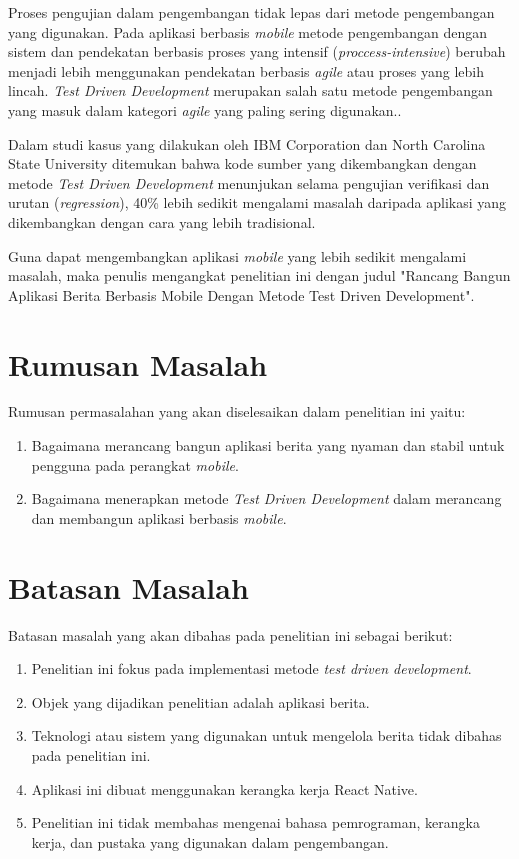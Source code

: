 \begin{spacing}{2}
Proses pengujian dalam pengembangan tidak lepas dari metode pengembangan yang digunakan. Pada aplikasi berbasis \emph{mobile} metode pengembangan dengan sistem dan pendekatan berbasis proses yang intensif (\emph{proccess-intensive}) berubah menjadi lebih menggunakan pendekatan berbasis \emph{agile} atau proses yang lebih lincah. \emph{Test Driven Development} merupakan salah satu metode pengembangan yang masuk dalam kategori \emph{agile} yang paling sering digunakan.\cite{wasserman2010}.

Dalam studi kasus yang dilakukan oleh IBM Corporation dan North Carolina State University ditemukan bahwa kode sumber yang dikembangkan dengan metode \emph{Test Driven Development} menunjukan selama pengujian verifikasi dan urutan (\emph{regression}), 40\% lebih sedikit mengalami masalah daripada aplikasi yang dikembangkan dengan cara yang lebih tradisional.\cite{laurie2003}

Guna dapat mengembangkan aplikasi \emph{mobile} yang lebih sedikit mengalami masalah, maka penulis mengangkat penelitian ini dengan judul "Rancang Bangun Aplikasi Berita Berbasis Mobile Dengan Metode Test Driven Development".

\section{Rumusan Masalah}
Rumusan permasalahan yang akan diselesaikan dalam penelitian ini yaitu:
\begin{enumerate}
  \item Bagaimana merancang bangun aplikasi berita yang nyaman dan stabil untuk pengguna pada perangkat \emph{mobile}.
  \item Bagaimana menerapkan metode \emph{Test Driven Development} dalam merancang dan membangun aplikasi berbasis \emph{mobile}.
\end{enumerate}

\section{Batasan Masalah}
Batasan masalah yang akan dibahas pada penelitian ini sebagai berikut:
\begin{enumerate}
  \item Penelitian ini fokus pada implementasi metode \emph{test driven development}.
  \item Objek yang dijadikan penelitian adalah aplikasi berita.
  \item Teknologi atau sistem yang digunakan untuk mengelola berita tidak dibahas pada penelitian ini.
  \item Aplikasi ini dibuat menggunakan kerangka kerja React Native.
  \item Penelitian ini tidak membahas mengenai bahasa pemrograman, kerangka kerja, dan pustaka yang digunakan dalam pengembangan.
\end{enumerate}



\end{spacing}
